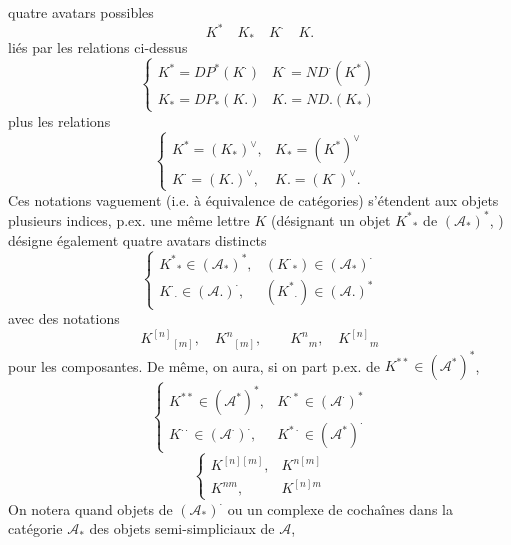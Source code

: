 \documentclass[11pt,a4paper]{article}
\begin{document}
quatre avatars possibles
\[
  K^{*} \quad K_{*} \quad K^{\cdot} \quad K.
\]
liés par les relations ci-dessus
\[
  \begin{cases}
    K^{*} = DP^{*}(K^{\cdot}) & K^{\cdot} = ND^{\cdot}(K^{*}) \\
    K_{*} = DP_{*}(K.) & K. = ND.(K_{*})
  \end{cases}
\]
plus les relations
\[
  \begin{cases}
    K^{*} = (K_{*})^{\vee}, & K_{*} = (K^{*})^{\vee} \\
    K^{\cdot} = (K.)^{\vee}, & K. = (K^{\cdot})^{\vee} .
  \end{cases}
\]
\struck{(\ill{})} Ces  notations  vaguement (i.e. à
équivalence de catégories) s'étendent aux objets \struck{\ill{}} 
plusieurs indices, p.ex.  une même lettre $K$ (désignant
 un objet $K^{*}{}_{*}$ de
$(\mathcal{A}_{*})^{*}$, ) désigne également \struck{\ill{}} quatre
avatars distincts
\[
  \begin{cases}
    K^{*}{}_{*} \in (\mathcal{A}_{*})^{*}, & (K^{\cdot}{}_{*}) \in (\mathcal{A}_{*})^{\cdot} \\
    K^{\cdot}{}_{\cdot} \in (\mathcal{A}.)^{\cdot}, & (K^{*}{}_{\cdot}) \in (\mathcal{A}.)^{*}
  \end{cases}
\]
avec des notations
\[
  K^{[n]}{}_{[m]}, \quad K^{n}{}_{[m]}, \qquad K^{n}{}_{m}, \quad K^{[n]}{}_{m}
\]
pour les composantes. De même, on aura, si on part p.ex. de
$K^{**} \in (\mathcal{A}^{*})^{*}$,
\[
  \begin{cases}
    K^{**} \in (\mathcal{A}^{*})^{*}, & K^{\cdot *} \in (\mathcal{A}^{\cdot})^{*} \\
    K^{\cdot\cdot} \in (\mathcal{A}^{\cdot})^{\cdot}, & K^{*\cdot} \in (\mathcal{A}^{*})^{\cdot}
  \end{cases}
\]
\[
  \begin{cases}
    K^{[n][m]}, & K^{n[m]} \\
    K^{nm}, & K^{[n]m}
  \end{cases}
\]
On notera quand objets de $(\mathcal{A}_{*})^{\cdot}$ ou un complexe de
cochaînes  dans la catégorie $\mathcal{A}_{*}$
des objets semi-simpliciaux de $\mathcal{A}$,
\end{document}

